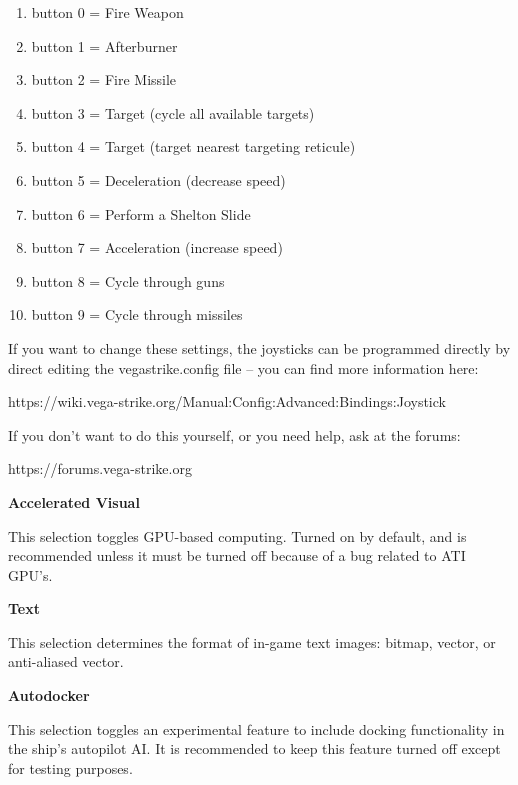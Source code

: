 \documentclass{article}
\begin{document}
\begin{enumerate}
\item  button 0 = Fire Weapon 

\item  button 1 = Afterburner 

\item  button 2 = Fire Missile 

\item  button 3 = Target (cycle all available targets) 

\item  button 4 = Target (target nearest targeting reticule) 

\item  button 5 = Deceleration (decrease speed) 

\item  button 6 = Perform a Shelton Slide 

\item  button 7 = Acceleration (increase speed) 

\item  button 8 = Cycle through guns 

\item  button 9 = Cycle through missiles 
\end{enumerate}



If you want to change these settings, the joysticks can be programmed directly by direct editing the vegastrike.config file -- you can find more information here:

https://wiki.vega-strike.org/Manual:Config:Advanced:Bindings:Joystick

If you don't want to do this yourself, or you need help, ask at the forums:

https://forums.vega-strike.org


\textbf{Accelerated Visual}

This selection toggles GPU-based computing. Turned on by default, and is recommended unless it must be turned off because of a bug related to ATI GPU's.


\textbf{Text}

This selection determines the format of in-game text images: bitmap, vector, or anti-aliased vector.

\textbf{Autodocker}

This selection toggles an experimental feature to include docking functionality in the ship's autopilot AI. It is recommended to keep this feature turned off except for testing purposes.
\end{document}
